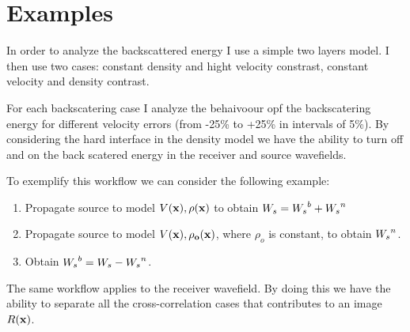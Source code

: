 \section{Examples}
In order to analyze the backscattered energy I use a simple two layers model. I then 
use two cases: constant density and hight  velocity constrast, constant velocity and density
contrast.  

For each backscatering case I analyze the behaivoour opf the backscatering energy for different
velocity errors (from -25\% to +25\% in intervals of 5\%). By considering the hard interface in 
the density model we have the ability to turn off and on the back scatered energy in the receiver
 and source wavefields.

To exemplify this workflow we can consider the following example:
\begin{enumerate}
\item Propagate source to model $V(\bf{x}), \rho(\bf{x})$ to obtain ${W_s}={W_s}^b +{W_s}^n$
\item Propagate source to model $V(\bf{x}), \rho_o(\bf{x})$, where
$\rho_o$ is constant, to obtain ${W_s}^n$.
\item Obtain ${W_s}^b= {W_s} -{W_s}^n$.
\end{enumerate}

The same workflow applies to the receiver wavefield. By doing this we have the ability to separate all 
the cross-correlation cases that contributes to an image $R(\bf{x})$.





